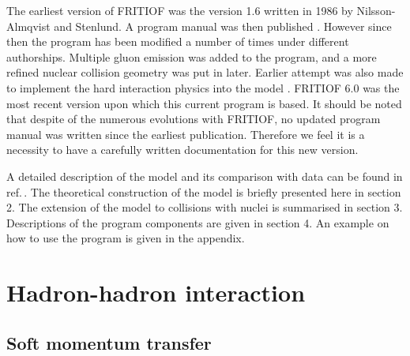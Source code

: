 The earliest version of FRITIOF was the version 1.6 written
in 1986 by Nilsson-Almqvist and Stenlund.  A program manual was then 
published \cite{fr16}.  However since then the program has been modified 
a number of times under different authorships.  Multiple gluon emission 
was added to the program, and a more refined nuclear collision geometry
\cite{ngeo} was put in later.  Earlier attempt was also made to implement 
the hard interaction physics into the model \cite{ohard}.  FRITIOF 6.0 was
the most recent version upon which this current program is based.  
It should be noted that despite of the numerous evolutions with FRITIOF,
no updated program manual was written since the earliest publication.
Therefore we feel it is a necessity to have a carefully written documentation
for this new version.  
  
A detailed description of the model and its comparison with data can be found in ref.\,\cite{prep1}.  The theoretical construction of the model is briefly presented here in section 2.  The extension of the model to collisions  with nuclei is summarised in section 3.  Descriptions of the program components are given in section 4.  An example on how to use the program is given
in the appendix.


\section{Hadron-hadron interaction}

\subsection{Soft momentum transfer}

